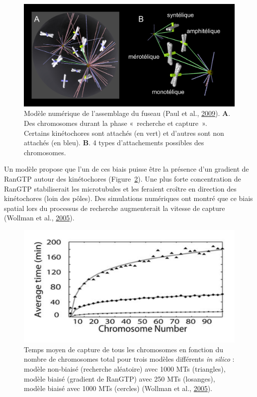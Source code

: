 \documentclass[12pt,a4paper,twoside,openright]{book}
\begin{document}
\begin{figure}[htbp]
\centering
\includegraphics{figures/intro/mogilner.png}
\caption{\label{fig:mogilner}Modèle numérique de l'assemblage du fuseau
(Paul et al., \protect\hyperlink{ref-Paul2009}{2009}). \textbf{A}. Des
chromosomes durant la phase «~recherche et capture~». Certains
kinétochores sont attachés (en vert) et d'autres sont non attachés (en
bleu). \textbf{B}. 4 types d'attachements possibles des chromosomes.}
\end{figure}

Un modèle propose que l'un de ces biais puisse être la présence d'un
gradient de RanGTP autour des kinétochores
(Figure~\ref{fig:assembly_time}). Une plus forte concentration de RanGTP
stabiliserait les microtubules et les feraient croître en direction des
kinétochores (loin des pôles). Des simulations numériques ont montré que
ce biais spatial lors du processus de recherche augmenterait la vitesse
de capture (Wollman et al., \protect\hyperlink{ref-Wollman2005}{2005}).

\begin{figure}[htbp]
\centering
\includegraphics{figures/intro/assembly_time.png}
\caption{\label{fig:assembly_time}Temps moyen de capture de tous les
chromosomes en fonction du nombre de chromosomes total pour trois
modèles différents \emph{in silico} : modèle non-biaisé (recherche
aléatoire) avec 1000 MTs (triangles), modèle biaisé (gradient de RanGTP)
avec 250 MTs (losanges), modèle biaisé avec 1000 MTs (cercles) (Wollman
et al., \protect\hyperlink{ref-Wollman2005}{2005}).}
\end{figure}
\end{document}
